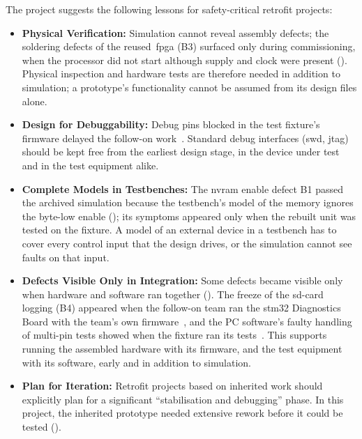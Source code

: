 The project suggests the following lessons for safety-critical retrofit projects:
\begin{itemize}
	\item \textbf{Physical Verification:} Simulation cannot reveal assembly defects; the soldering defects of the reused~\gls{fpga} (B3) surfaced only during commissioning, when the processor did not start although supply and clock were present (). Physical inspection and hardware tests are therefore needed in addition to simulation; a prototype's functionality cannot be assumed from its design files alone.
	\item \textbf{Design for Debuggability:} Debug pins blocked in the test fixture's firmware delayed the follow-on work~\cite[pp.~10, 12]{savchuk2025}. Standard debug interfaces (\gls{swd}, \gls{jtag}) should be kept free from the earliest design stage, in the device under test and in the test equipment alike.
	\item \textbf{Complete Models in Testbenches:} The \gls{nvram} enable defect B1 passed the archived simulation because the testbench's model of the memory ignores the byte-low enable (); its symptoms appeared only when the rebuilt unit was tested on the fixture. A model of an external device in a testbench has to cover every control input that the design drives, or the simulation cannot see faults on that input.
	\item \textbf{Defects Visible Only in Integration:} Some defects became visible only when hardware and software ran together (). The freeze of the \gls{sd}-card logging (B4) appeared when the follow-on team ran the \gls{stm32} Diagnostics Board with the team's own firmware~\cite[pp.~19, 22]{savchuk2025}, and the PC software's faulty handling of multi-pin tests showed when the fixture ran its tests~\cite[pp.~10--11, 14]{savchuk2025}. This supports running the assembled hardware with its firmware, and the test equipment with its software, early and in addition to simulation.
	\item \textbf{Plan for Iteration:} Retrofit projects based on inherited work should explicitly plan for a significant \enquote{stabilisation and debugging} phase. In this project, the inherited prototype needed extensive rework before it could be tested ().
\end{itemize}

